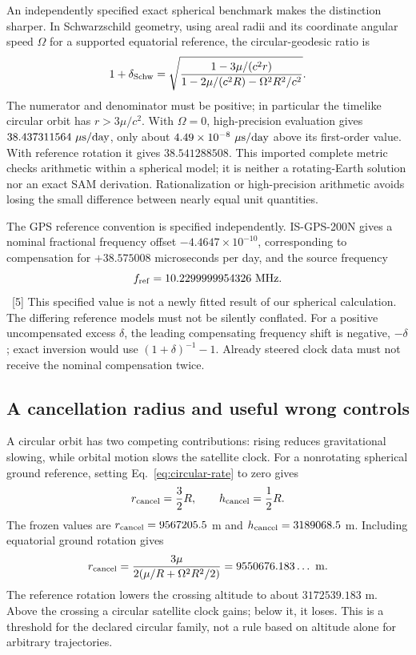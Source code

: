 \documentclass[10pt,twocolumn,letterpaper]{article}
\begin{document}
An independently specified exact spherical benchmark makes the distinction sharper. In Schwarzschild geometry, using areal radii and its coordinate angular speed $\Omega$ for a supported equatorial reference, the circular-geodesic ratio is
\[
 1+\delta_{\rm Schw}
 =\sqrt{\frac{1-3\mu/(c^2r)}
 {1-2\mu/(c^2R)-\Omega^2R^2/c^2}}.
\]
The numerator and denominator must be positive; in particular the timelike circular orbit has $r>3\mu/c^2$. With $\Omega=0$, high-precision evaluation gives $38.437311564\ \mu{\rm s/day}$, only about $4.49\times 10^{-8}\ \mu{\rm s/day}$ above its first-order value. With reference rotation it gives $38.541288508$. This imported complete metric checks arithmetic within a spherical model; it is neither a rotating-Earth solution nor an exact SAM derivation. Rationalization or high-precision arithmetic avoids losing the small difference between nearly equal unit quantities.

The GPS reference convention is specified independently. IS-GPS-200N gives a nominal fractional frequency offset $-4.4647\times 10^{-10}$, corresponding to compensation for $+38.575008$ microseconds per day, and the source frequency\[f_{\rm ref}=10.2299999954326\ {\rm MHz}.\]~[5] This specified value is not a newly fitted result of our spherical calculation. The differing reference models must not be silently conflated. For a positive uncompensated excess $\delta$, the leading compensating frequency shift is negative, $-\delta$; exact inversion would use $(1+\delta)^{-1}-1$. Already steered clock data must not receive the nominal compensation twice.


\subsection{A cancellation radius and useful wrong controls}
A circular orbit has two competing contributions: rising reduces gravitational slowing, while orbital motion slows the satellite clock. For a nonrotating spherical ground reference, setting Eq.~\eqref{eq:circular-rate} to zero gives
\[
 r_{\rm cancel}=\frac 32R,\qquad
 h_{\rm cancel}=\frac 12R.
\]
The frozen values are $r_{\rm cancel}=9567205.5$ m and $h_{\rm cancel}=3189068.5$ m. Including equatorial ground rotation gives
\[
 r_{\rm cancel}
 =\frac{3\mu}{2(\mu/R+\Omega^2R^2/2)}
 =9550676.183\ldots\ {\rm m}.
\]
The reference rotation lowers the crossing altitude to about $3172539.183$ m. Above the crossing a circular satellite clock gains; below it, it loses. This is a threshold for the declared circular family, not a rule based on altitude alone for arbitrary trajectories.
\end{document}
